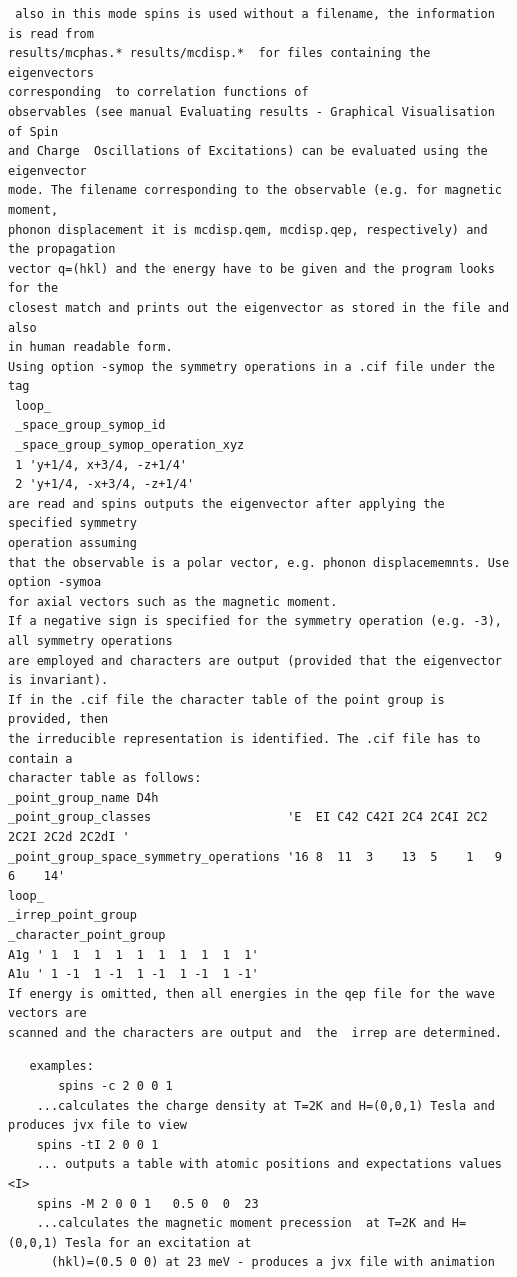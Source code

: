 \begin{description}
\begin{verbatim}
 also in this mode spins is used without a filename, the information is read from 
results/mcphas.* results/mcdisp.*  for files containing the eigenvectors 
corresponding  to correlation functions of
observables (see manual Evaluating results - Graphical Visualisation of Spin
and Charge  Oscillations of Excitations) can be evaluated using the eigenvector
mode. The filename corresponding to the observable (e.g. for magnetic moment,
phonon displacement it is mcdisp.qem, mcdisp.qep, respectively) and the propagation
vector q=(hkl) and the energy have to be given and the program looks for the 
closest match and prints out the eigenvector as stored in the file and also 
in human readable form.
Using option -symop the symmetry operations in a .cif file under the tag
 loop_
 _space_group_symop_id
 _space_group_symop_operation_xyz
 1 'y+1/4, x+3/4, -z+1/4'
 2 'y+1/4, -x+3/4, -z+1/4'
are read and spins outputs the eigenvector after applying the specified symmetry 
operation assuming
that the observable is a polar vector, e.g. phonon displacememnts. Use option -symoa 
for axial vectors such as the magnetic moment.
If a negative sign is specified for the symmetry operation (e.g. -3), all symmetry operations
are employed and characters are output (provided that the eigenvector is invariant).
If in the .cif file the character table of the point group is provided, then 
the irreducible representation is identified. The .cif file has to contain a 
character table as follows:
_point_group_name D4h
_point_group_classes                   'E  EI C42 C42I 2C4 2C4I 2C2 2C2I 2C2d 2C2dI '
_point_group_space_symmetry_operations '16 8  11  3    13  5    1   9    6    14'
loop_
_irrep_point_group
_character_point_group
A1g ' 1  1  1  1  1  1  1  1  1  1'
A1u ' 1 -1  1 -1  1 -1  1 -1  1 -1'
If energy is omitted, then all energies in the qep file for the wave vectors are
scanned and the characters are output and  the  irrep are determined.
\end{verbatim}
\end{description} 

\begin{verbatim}
   examples:
       spins -c 2 0 0 1
    ...calculates the charge density at T=2K and H=(0,0,1) Tesla and produces jvx file to view
    spins -tI 2 0 0 1 
    ... outputs a table with atomic positions and expectations values <I> 
    spins -M 2 0 0 1   0.5 0  0  23
    ...calculates the magnetic moment precession  at T=2K and H=(0,0,1) Tesla for an excitation at
      (hkl)=(0.5 0 0) at 23 meV - produces a jvx file with animation

\end{verbatim}


